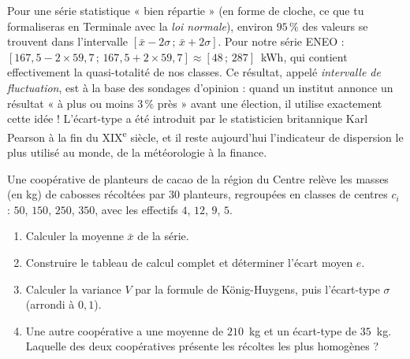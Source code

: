\documentclass[11pt]{article}
\begin{document}
\begin{savaistu}
Pour une série statistique « bien répartie » (en forme de cloche, ce que tu formaliseras en Terminale avec la \emph{loi normale}), environ $95\,\%$ des valeurs se trouvent dans l'intervalle $\left[\bar{x} - 2\sigma \,;\, \bar{x} + 2\sigma\right]$. Pour notre série ENEO : $\left[167{,}5 - 2\times 59{,}7 \,;\, 167{,}5 + 2\times 59{,}7\right] \approx [48 \,;\, 287]$~kWh, qui contient effectivement la quasi-totalité de nos classes. Ce résultat, appelé \emph{intervalle de fluctuation}, est à la base des sondages d'opinion : quand un institut annonce un résultat « à plus ou moins $3\,\%$ près » avant une élection, il utilise exactement cette idée ! L'écart-type a été introduit par le statisticien britannique Karl Pearson à la fin du XIX\textsuperscript{e} siècle, et il reste aujourd'hui l'indicateur de dispersion le plus utilisé au monde, de la météorologie à la finance.
\end{savaistu}

\begin{exercice}
Une coopérative de planteurs de cacao de la région du Centre relève les masses (en kg) de cabosses récoltées par $30$ planteurs, regroupées en classes de centres $c_i$ : $50$, $150$, $250$, $350$, avec les effectifs $4$, $12$, $9$, $5$.
\begin{enumerate}
\item Calculer la moyenne $\bar{x}$ de la série.
\item Construire le tableau de calcul complet et déterminer l'écart moyen $e$.
\item Calculer la variance $V$ par la formule de König-Huygens, puis l'écart-type $\sigma$ (arrondi à $0{,}1$).
\item Une autre coopérative a une moyenne de $210$~kg et un écart-type de $35$~kg. Laquelle des deux coopératives présente les récoltes les plus homogènes ?
\end{enumerate}
\end{exercice}
\end{document}

